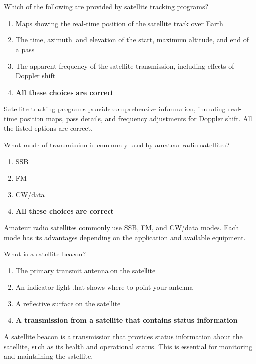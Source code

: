 
\begin{tcolorbox}[colback=gray!10!white,colframe=black!75!black,title={T8B03}]
    Which of the following are provided by satellite tracking programs?
    \begin{enumerate}[label=\Alph*,noitemsep]
        \item Maps showing the real-time position of the satellite track over Earth
        \item The time, azimuth, and elevation of the start, maximum altitude, and end of a pass
        \item The apparent frequency of the satellite transmission, including effects of Doppler shift
        \item \textbf{All these choices are correct}
    \end{enumerate}
\end{tcolorbox}
Satellite tracking programs provide comprehensive information, including real-time position maps, pass details, and frequency adjustments for Doppler shift. All the listed options are correct.


\begin{tcolorbox}[colback=gray!10!white,colframe=black!75!black,title={T8B04}]
    What mode of transmission is commonly used by amateur radio satellites?
    \begin{enumerate}[label=\Alph*,noitemsep]
        \item SSB
        \item FM
        \item CW/data
        \item \textbf{All these choices are correct}
    \end{enumerate}
\end{tcolorbox}
Amateur radio satellites commonly use SSB, FM, and CW/data modes. Each mode has its advantages depending on the application and available equipment.


\begin{tcolorbox}[colback=gray!10!white,colframe=black!75!black,title={T8B05}]
    What is a satellite beacon?
    \begin{enumerate}[label=\Alph*,noitemsep]
        \item The primary transmit antenna on the satellite
        \item An indicator light that shows where to point your antenna
        \item A reflective surface on the satellite
        \item \textbf{A transmission from a satellite that contains status information}
    \end{enumerate}
\end{tcolorbox}
A satellite beacon is a transmission that provides status information about the satellite, such as its health and operational status. This is essential for monitoring and maintaining the satellite.

